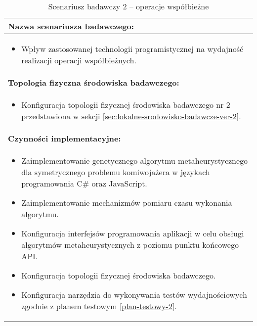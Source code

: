 \setlength{\LTcapwidth}{\textwidth}
\setlength\LTleft{0pt}
\setlength\LTright{0pt}
\begin{longtable}[c]{|llll|}
    \caption{Scenariusz badawczy 2 -- operacje współbieżne}
    \label{tab:research-scenario-2}                                                  \\ \hline
    \multicolumn{4}{|l|}{\textbf{Nazwa scenariusza badawczego:}}                     \\ \hline
    \multicolumn{4}{|p{\linewidth}|}{
        \begin{itemize}[label={}]
            \item Wpływ zastosowanej technologii programistycznej na wydajność realizacji operacji współbieżnych.
          \end{itemize}
    } \\ \hline
    \multicolumn{4}{|l|}{\textbf{Topologia fizyczna środowiska badawczego:}}         \\ \hline
    \multicolumn{4}{|p{\linewidth}|}{
        \begin{itemize}[label={}]
            \item Konfiguracja topologii fizycznej środowiska badawczego nr 2 przedstawiona w sekcji \ref{sec:lokalne-srodowisko-badawcze-ver-2}.
          \end{itemize}
    }\\ \hline
    \multicolumn{4}{|l|}{\textbf{Czynności implementacyjne:}}                        \\ \hline
    \multicolumn{4}{|p{\linewidth}|}{
        \begin{itemize}
            \item Zaimplementowanie genetycznego algorytmu metaheurystycznego dla symetrycznego problemu komiwojażera w językach programowania C\# oraz JavaScript.
            \item Zaimplementowanie mechanizmów pomiaru czasu wykonania algorytmu.
            \item Konfiguracja interfejsów programowania aplikacji w celu obsługi algorytmów metaheurystycznych z poziomu punktu końcowego API.
            \item Konfiguracja topologii fizycznej środowiska badawczego.
            \item Konfiguracja narzędzia do wykonywania testów wydajnościowych zgodnie z planem testowym \ref{plan-testowy-2}.
        \end{itemize}}                                                           \\ \hline

\end{longtable}
